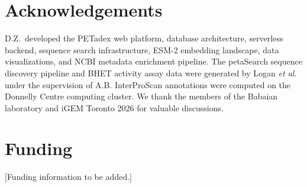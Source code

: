 \documentclass[unnumsec,webpdf,modern,large]{oup-authoring-template}
\begin{document}
\section{Acknowledgements}

D.Z.\ developed the PETadex web platform, database architecture, serverless backend, sequence search infrastructure, ESM-2 embedding landscape, data visualizations, and NCBI metadata enrichment pipeline. The petaSearch sequence discovery pipeline and BHET activity assay data were generated by Logan \textit{et al.}\ \citep{chikhi_logan_2025} under the supervision of A.B. InterProScan annotations were computed on the Donnelly Centre computing cluster. We thank the members of the Babaian laboratory and iGEM Toronto 2026 for valuable discussions.

\section{Funding}

[Funding information to be added.]



\end{document}
